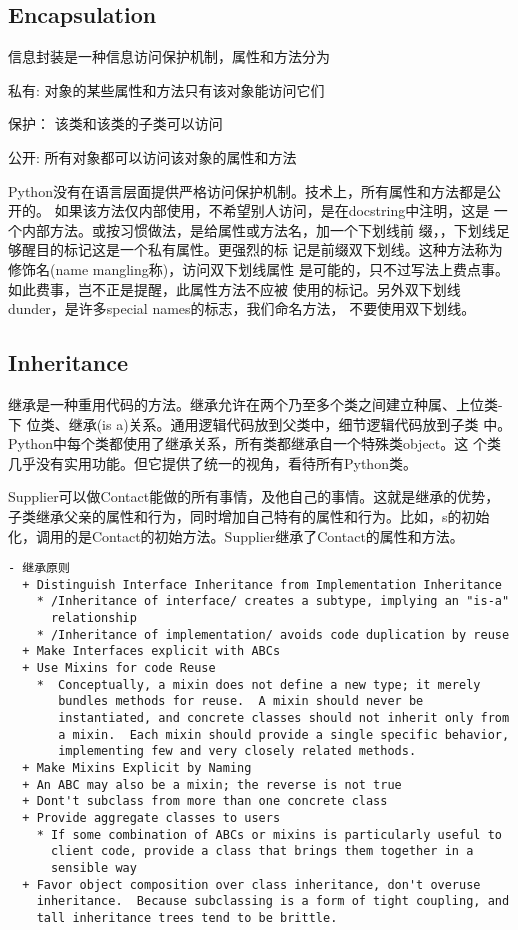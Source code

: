 \subsection{Encapsulation}
信息封装是一种信息访问保护机制，属性和方法分为
\begin{description}
\item{私有:} 对象的某些属性和方法只有该对象能访问它们
\item{保护：} 该类和该类的子类可以访问
\item{公开:} 所有对象都可以访问该对象的属性和方法
\end{description}

Python没有在语言层面提供严格访问保护机制。技术上，所有属性和方法都是公
开的。 如果该方法仅内部使用，不希望别人访问，是在docstring中注明，这是
一个内部方法。或按习惯做法，是给属性或方法名，加一个下划线前
缀，，下划线足够醒目的标记这是一个私有属性。更强烈的标
记是前缀双下划线。这种方法称为修饰名(name mangling称)，访问双下划线属性
是可能的，只不过写法上费点事。如此费事，岂不正是提醒，此属性方法不应被
使用的标记。另外双下划线dunder，是许多special names的标志，我们命名方法，
不要使用双下划线。
\subsection{Inheritance}
继承是一种重用代码的方法。继承允许在两个乃至多个类之间建立种属、上位类-下
位类、继承(is a)关系。通用逻辑代码放到父类中，细节逻辑代码放到子类
中。Python中每个类都使用了继承关系，所有类都继承自一个特殊类object。这
个类几乎没有实用功能。但它提供了统一的视角，看待所有Python类。

Supplier可以做Contact能做的所有事情，及他自己的事情。这就是继承的优势，子类继承父亲的属性和行为，同时增加自己特有的属性和行为。比如，s的初始化，调用的是Contact的初始方法。Supplier继承了Contact的属性和方法。
\begin{framed}
  \begin{verbatim}
- 继承原则
  + Distinguish Interface Inheritance from Implementation Inheritance
    * /Inheritance of interface/ creates a subtype, implying an "is-a"
      relationship
    * /Inheritance of implementation/ avoids code duplication by reuse
  + Make Interfaces explicit with ABCs
  + Use Mixins for code Reuse
    *  Conceptually, a mixin does not define a new type; it merely
       bundles methods for reuse.  A mixin should never be
       instantiated, and concrete classes should not inherit only from
       a mixin.  Each mixin should provide a single specific behavior,
       implementing few and very closely related methods.
  + Make Mixins Explicit by Naming
  + An ABC may also be a mixin; the reverse is not true
  + Dont't subclass from more than one concrete class
  + Provide aggregate classes to users
    * If some combination of ABCs or mixins is particularly useful to
      client code, provide a class that brings them together in a
      sensible way
  + Favor object composition over class inheritance, don't overuse
    inheritance.  Because subclassing is a form of tight coupling, and
    tall inheritance trees tend to be brittle. 
\end{verbatim}
\end{framed}
    
